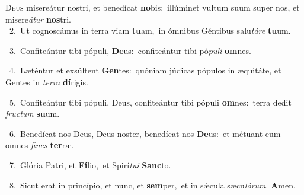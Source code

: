 \lettrine{\initial\textcolor{\initialcolor}{D}}{eus} misereátur nostri, et benedícat \textbf{no}\-bis:~\star illúminet vultum suum super nos, et misere\-\textit{á}\-\textit{tur} \textbf{nos}\-tri.\\
{\numbfont\textcolor{\numbcolor}{~2.}}~Ut cognoscámus in terra viam \textbf{tu}\-am,~\star in ómnibus Géntibus salu\-\textit{tá}\-\textit{re} \textbf{tu}\-um.\par
{\numbfont\textcolor{\numbcolor}{~3.}}~Confiteántur tibi pópuli, \textbf{De}\-us:~\star confiteántur tibi pó\-\textit{pu}\-\textit{li} \textbf{om}\-nes.\par
{\numbfont\textcolor{\numbcolor}{~4.}}~Læténtur et exsúltent \textbf{Gen}\-tes:~\star quóniam júdicas pópulos in æquitáte, et Gentes in \textit{ter}\-\textit{ra} \textbf{dí}\-rigis.\par
{\numbfont\textcolor{\numbcolor}{~5.}}~Confiteántur tibi pópuli, Deus, confiteántur tibi pópuli \textbf{om}\-nes:~\star terra dedit \textit{fruc}\-\textit{tum} \textbf{su}\-um.\par
{\numbfont\textcolor{\numbcolor}{~6.}}~Benedícat nos Deus, Deus noster, benedícat nos \textbf{De}\-us:~\star et métuant eum omnes \textit{fi}\-\textit{nes} \textbf{ter}\-ræ.\par
{\numbfont\textcolor{\numbcolor}{~7.}}~Glória Patri, et \textbf{Fí}\-lio,~\star et Spirí\-\textit{tu}\-\textit{i} \textbf{Sanc}\-to.\par
{\numbfont\textcolor{\numbcolor}{~8.}}~Sicut erat in princípio, et nunc, et \textbf{sem}\-per,~\star et in sǽcula sæcu\-\textit{ló}\-\textit{rum}. \textbf{A}\-men.\par
